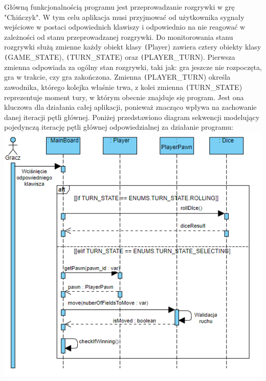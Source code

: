 \documentclass[conference]{IEEEtran}
\begin{document}
Główną funkcjonalnością programu jest przeprowadzanie rozgrywki w grę "Chińczyk". W tym celu aplikacja musi przyjmować od użytkownika sygnały wejściowe w postaci odpowiednich klawiszy i odpowiednio na nie reagować w zależności od stanu przeprowadzanej rozgrywki. Do monitorowania stanu rozgrywki służą zmienne każdy obiekt klasy \texttt(Player) zawiera cztery obiekty klasy \texttt(GAME\_STATE), \texttt(TURN\_STATE) oraz \texttt(PLAYER\_TURN). Pierwsza zmienna odpowiada za ogólny stan rozgrywki, taki jak: gra jeszcze nie rozpoczęta, gra w trakcie, czy gra zakończona. Zmienna \texttt(PLAYER\_TURN) określa zawodnika, którego kolejka właśnie trwa, z kolei zmienna \texttt(TURN\_STATE) reprezentuje moment tury, w którym obecnie znajduje się program. Jest ona kluczowa dla działania całej aplikacji, ponieważ znacząco wpływa na zachowanie danej iteracji pętli głównej. \newpage
Poniżej przedstawiono diagram sekwencji modelujący pojedynczą iterację pętli głównej odpowiedzialnej za działanie programu:
\hspace*{-0.1cm}\includegraphics[scale=0.65]{Sequence.PNG} \par
\end{document}
